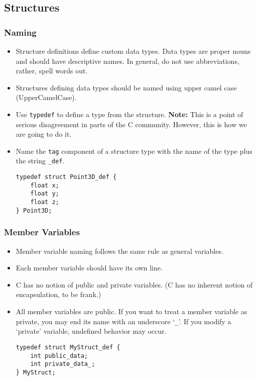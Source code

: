 \subsection{Structures}

\subsubsection{Naming}

\begin{itemize}
    \item Structure definitions define custom data types.  Data types are proper nouns and should have descriptive names.  In general, do not use abbreviations, rather, spell words out.
    \item Structures defining data types should be named using upper camel case (UpperCamelCase).
    \item Use \texttt{typedef} to define a type from the structure.  \textbf{Note:} This is a point of serious disagreement in parts of the C community.  However, this is how we are going to do it.
    \item Name the \texttt{tag} component of a structure type with the name of the type plus the string \texttt{\_def}.
        \begin{verbatim}
typedef struct Point3D_def {
    float x;
    float y;
    float z;
} Point3D;
        \end{verbatim}
\end{itemize}

\subsubsection{Member Variables}

\begin{itemize}
    \item Member variable naming follows the same rule as general variables.
    \item Each member variable should have its own line.
    \item C has no notion of public and private variables.  (C has no inherent notion of encapsulation, to be frank.)
    \item All member variables are public.  If you want to treat a member variable as private, you may end its name with an underscore `\texttt{\_}'.  If you modify a `private' variable, undefined behavior may occur.
        \begin{verbatim}
typedef struct MyStruct_def {
    int public_data;
    int private_data_;
} MyStruct;
        \end{verbatim}
\end{itemize}


